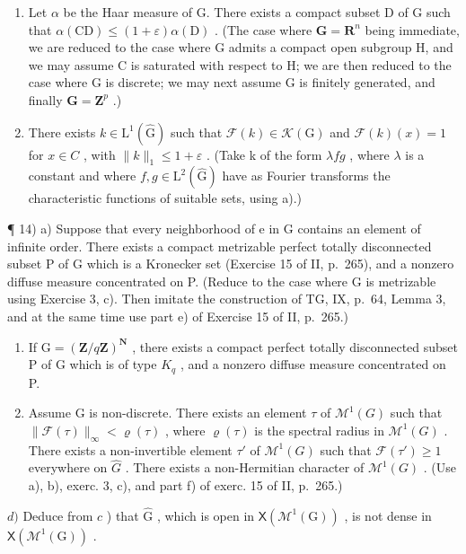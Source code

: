 \begin{enumerate}
\def\labelenumi{\alph{enumi})}
\item
  Let \(\alpha\) be the Haar measure of G. There exists a compact subset D of G such that \(\alpha(\mathrm{CD}) \leqslant (1 + \varepsilon)\alpha(\mathrm{D})\) . (The case where \(\mathbf{G} = \mathbf{R}^n\) being immediate, we are reduced to the case where G admits a compact open subgroup H, and we may assume C is saturated with respect to H; we are then reduced to the case where G is discrete; we may next assume G is finitely generated, and finally \(\mathbf{G} = \mathbf{Z}^p\) .)
\item
  There exists \(k \in \mathrm{L}^{1}(\widehat{\mathrm{G}})\) such that \(\mathcal{F}(k) \in \mathcal{K}(\mathrm{G})\) and \(\mathcal{F}(k)(x) = 1\) for \(x \in C\) , with \(\|k\|_{1} \leqslant 1 + \varepsilon\) . (Take k of the form \(\lambda fg\) , where \(\lambda\) is a constant and where \(f, g \in \mathrm{L}^{2}(\widehat{\mathrm{G}})\) have as Fourier transforms the characteristic functions of suitable sets, using a).)
\end{enumerate}

¶ 14) a) Suppose that every neighborhood of e in G contains an element of infinite order. There exists a compact metrizable perfect totally disconnected subset P of G which is a Kronecker set (Exercise 15 of II, p.~265), and a nonzero diffuse measure concentrated on P. (Reduce to the case where G is metrizable using Exercise 3, c). Then imitate the construction of TG, IX, p.~64, Lemma 3, and at the same time use part e) of Exercise 15 of II, p.~265.)

\begin{enumerate}
\def\labelenumi{\alph{enumi})}
\setcounter{enumi}{1}
\item
  If \(\mathrm{G} = (\mathbf{Z}/q\mathbf{Z})^{\mathbf{N}}\) , there exists a compact perfect totally disconnected subset P of G which is of type \(K_{q}\) , and a nonzero diffuse measure concentrated on P.
\item
  Assume G is non-discrete. There exists an element \(\tau\) of \(\mathcal{M}^{1}(G)\) such that \(\|\mathcal{F}(\tau)\|_{\infty}<\varrho(\tau)\) , where \(\varrho(\tau)\) is the spectral radius in \(\mathcal{M}^{1}(G)\) . There exists a non-invertible element \(\tau'\) of \(\mathcal{M}^{1}(G)\) such that \(\mathcal{F}(\tau')\geqslant1\) everywhere on \(\widehat{G}\) . There exists a non-Hermitian character of \(\mathcal{M}^{1}(G)\) . (Use a), b), exerc. 3, c), and part f) of exerc. 15 of II, p.~265.)
\end{enumerate}

\(d)\) Deduce from \(c\) ) that \(\widehat{\mathrm{G}}\) , which is open in \(\mathsf{X}(\mathcal{M}^1 (\mathrm{G}))\) , is not dense in \(\mathsf{X}(\mathcal{M}^1 (\mathrm{G}))\) .

